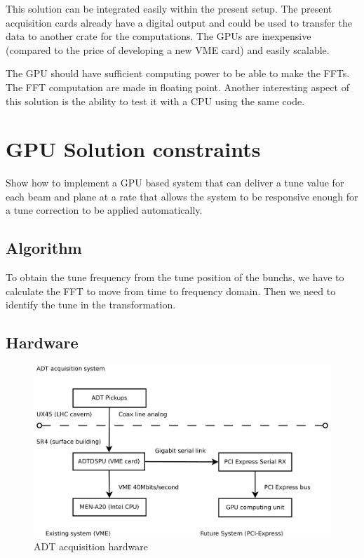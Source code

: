 This solution can be integrated easily within the present setup. The present acquisition cards already have a digital output and could be used to transfer the data to another crate for the computations. The \glspl{GPU} are inexpensive (compared to the price of developing a new \gls{VME} card) and easily scalable. 

The \gls{GPU} should have sufficient computing power to be able to make the \glspl{FFT}. The \gls{FFT} computation are made in floating point. Another interesting aspect of this solution is the ability to test it with a \gls{CPU} using the same code.

\section{GPU Solution constraints}

Show how to implement a GPU based system that can deliver a tune value for each beam and plane at a rate that allows the system to be responsive enough for a tune correction to be applied automatically. 

\subsection{Algorithm}

To obtain the tune frequency from the tune position of the \glspl{bunch}, we have to calculate the FFT to move from time to frequency domain. Then we need to identify the tune in the transformation.

\subsection{Hardware}

\begin{figure}[H]
\caption{ADT acquisition hardware}
\centering
\includegraphics[scale=0.3]{acquisition.pdf}
\end{figure}

